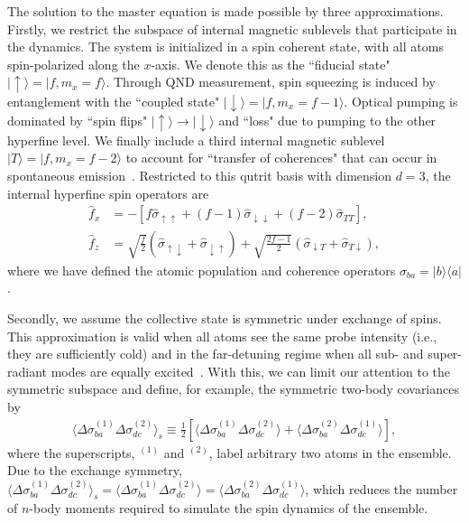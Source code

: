 \documentclass[aps,pra,twocolumn,superscriptaddress]{revtex4-1} %
\def\bra#1{\langle{#1}\rvert}%
\def\ket#1{\lvert{#1}\rangle}%
\newcommand{\expect}[1]{\big\langle #1 \big\rangle}
\begin{document}
The solution to the master equation is made possible by three approximations. Firstly, we restrict the subspace of internal magnetic sublevels that participate in the dynamics.  The system is initialized in a spin coherent state, with all atoms spin-polarized along the $x$-axis.  We denote this as the ``fiducial state" $\ket{\uparrow} = \ket{f, m_x =f}$.   Through QND measurement, spin squeezing is induced by entanglement with the  ``coupled state"  $\ket{\downarrow} = \ket{f, m_x=f-1}$.  Optical pumping is dominated by ``spin flips" $\ket{\uparrow}\rightarrow \ket{\downarrow}$ and ``loss" due to pumping to the other hyperfine level.  We finally include a third internal magnetic sublevel $\ket{T} = \ket{f, m_x=f-2}$ to account for  ``transfer of coherences" that can occur in spontaneous emission~\cite{Norris2012Enhanced,Norris2014}.  Restricted to this qutrit basis with dimension $ d=3 $, the internal hyperfine spin operators are
\begin{subequations}\label{eq:fxfz_xbasis}
\begin{align}
\hat{f}_x &= -\left[f \hat{\sigma}_{\uparrow \uparrow} +(f-1) \hat{\sigma}_{\downarrow \downarrow} + (f-2)  \hat{\sigma}_{T T}\right], \\
\hat{f}_z &= \sqrt{\frac{f}{2}} \left(\hat{\sigma}_{\uparrow \downarrow} + \hat{\sigma}_{\downarrow \uparrow}\right) + \sqrt{\frac{2f-1}{2}}  \left(\hat{\sigma}_{\downarrow T} + \hat{\sigma}_{T \downarrow }\right),
\end{align}
\end{subequations}
where we have defined the atomic population and coherence operators $\hat{\sigma}_{ba}=\ket{b}\bra{a}$.

Secondly, we assume the collective state is symmetric under exchange of spins. This approximation is valid when all atoms see the same probe intensity (i.e., they are sufficiently cold) and in the far-detuning regime when all sub- and super-radiant modes are equally excited~\cite{Asenjo-Garcia2017Atom,Asenjo-Garcia2017Exponential}. With this, we can limit our attention to the symmetric subspace and define, for example, the symmetric two-body covariances by
\begin{align}
\expect{\!\Delta\sigma_{ba}^{(1)}\Delta\sigma_{dc}^{(2)}}_s \!\!\equiv\! \frac{1}{2}\!\left[\expect{\!\Delta\sigma_{ba}^{(1)}\Delta\sigma_{dc}^{(2)}}\!+\!\expect{\!\Delta\sigma_{ba}^{(2)}\Delta\sigma_{dc}^{(1)}} \right] ,
\end{align}
where the superscripts, $ ^{(1)} $ and $ ^{(2)} $, label arbitrary two atoms in the ensemble. Due to the exchange symmetry, $ \expect{\Delta\sigma_{ba}^{(1)}\Delta\sigma_{dc}^{(2)}}_s=\expect{\Delta\sigma_{ba}^{(1)}\Delta\sigma_{dc}^{(2)}}=\expect{\Delta\sigma_{ba}^{(2)}\Delta\sigma_{dc}^{(1)}} $, which reduces the number of $ n $-body moments required to simulate the spin dynamics of the ensemble.
\end{document}
